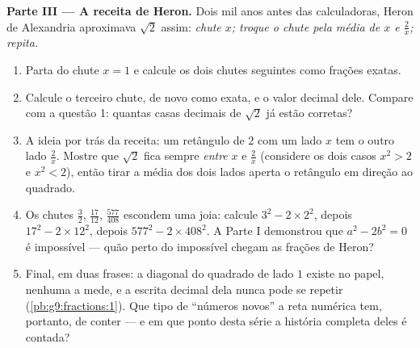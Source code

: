 \begin{problem}
\medskip
\noindent\textbf{Parte III --- A receita de Heron.}
Dois mil anos antes das calculadoras, Heron de Alexandria aproximava
$\sqrt2$ assim: \emph{chute $x$; troque o chute pela média de $x$ e
$\frac2x$; repita.}
\begin{enumerate}[resume]
  \item Parta do chute $x = 1$ e calcule os dois chutes seguintes como
        frações exatas.
  \item Calcule o terceiro chute, de novo como  exata, e o valor
        decimal dele. Compare com a questão 1: quantas casas decimais
        de $\sqrt2$ já estão corretas?
  \item A ideia por trás da receita: um retângulo de  $2$ com um
        lado $x$ tem o outro lado $\frac2x$. Mostre que $\sqrt2$ fica
        sempre \emph{entre} $x$ e $\frac2x$ (considere os dois casos
        $x^2 > 2$ e $x^2 < 2$), então tirar a média dos dois lados
        aperta o retângulo em direção ao quadrado.
  \item Os chutes $\frac32$, $\frac{17}{12}$, $\frac{577}{408}$
        escondem uma joia: calcule $3^2 - 2 \times 2^2$, depois
        $17^2 - 2 \times 12^2$, depois $577^2 - 2 \times 408^2$. A
        Parte I demonstrou que $a^2 - 2b^2 = 0$ é impossível --- quão
        perto do impossível chegam as frações de Heron?
  \item Final, em duas frases: a diagonal do quadrado de lado $1$
        existe no papel,  nenhuma a mede, e a escrita decimal
        dela nunca pode se repetir (\cref{pb:g9:fractions:1}). Que tipo
        de ``números novos'' a reta numérica tem, portanto, de conter
        --- e em que ponto desta série a história completa deles é
        contada?
\end{enumerate}
\end{problem}
